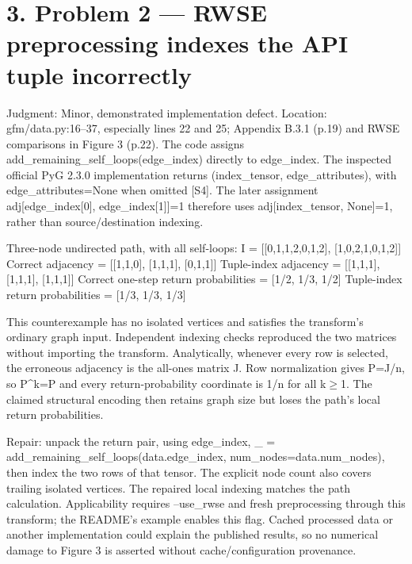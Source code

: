 \documentclass[10pt]{article}
\begin{document}
\section*{3. Problem 2 — RWSE preprocessing indexes the API tuple incorrectly}
Judgment: Minor, demonstrated implementation defect. Location: gfm/data.py:16–37, especially lines 22 and 25; Appendix B.3.1 (p.19) and RWSE comparisons in Figure 3 (p.22). The code assigns add\_remaining\_self\_loops(edge\_index) directly to edge\_index. The inspected official PyG 2.3.0 implementation returns (index\_tensor, edge\_attributes), with edge\_attributes=None when omitted [S4]. The later assignment adj[edge\_index[0], edge\_index[1]]=1 therefore uses adj[index\_tensor, None]=1, rather than source/destination indexing.\par
Three-node undirected path, with all self-loops:
I = [[0,1,1,2,0,1,2], [1,0,2,1,0,1,2]]
Correct adjacency = [[1,1,0], [1,1,1], [0,1,1]]
Tuple-index adjacency = [[1,1,1], [1,1,1], [1,1,1]]
Correct one-step return probabilities = [1/2, 1/3, 1/2]
Tuple-index return probabilities = [1/3, 1/3, 1/3]\par
This counterexample has no isolated vertices and satisfies the transform’s ordinary graph input. Independent indexing checks reproduced the two matrices without importing the transform. Analytically, whenever every row is selected, the erroneous adjacency is the all-ones matrix J. Row normalization gives P=J/n, so P\textasciicircum{}k=P and every return-probability coordinate is 1/n for all k\(\geq\)1. The claimed structural encoding then retains graph size but loses the path’s local return probabilities.\par
Repair: unpack the return pair, using edge\_index, \_ = add\_remaining\_self\_loops(data.edge\_index, num\_nodes=data.num\_nodes), then index the two rows of that tensor. The explicit node count also covers trailing isolated vertices. The repaired local indexing matches the path calculation. Applicability requires –use\_rwse and fresh preprocessing through this transform; the README’s example enables this flag. Cached processed data or another implementation could explain the published results, so no numerical damage to Figure 3 is asserted without cache/configuration provenance.\par
\end{document}
